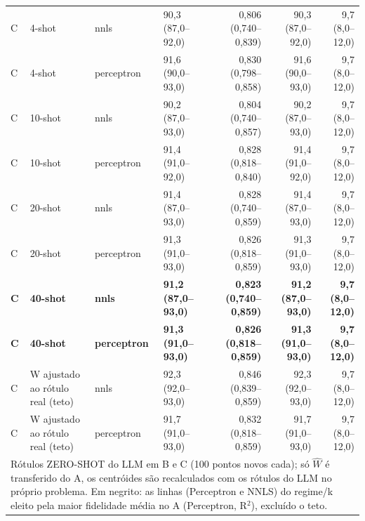 \begin{table}[htbp]
\begin{tabular}{llllrrr}
C & 4-shot & nnls & 90,3 (87,0–92,0) & 0,806 (0,740–0,839) & 90,3 (87,0–92,0) & 9,7 (8,0–12,0) \\
C & 4-shot & perceptron & 91,6 (90,0–93,0) & 0,830 (0,798–0,858) & 91,6 (90,0–93,0) & 9,7 (8,0–12,0) \\
C & 10-shot & nnls & 90,2 (87,0–93,0) & 0,804 (0,740–0,857) & 90,2 (87,0–93,0) & 9,7 (8,0–12,0) \\
C & 10-shot & perceptron & 91,4 (91,0–92,0) & 0,828 (0,818–0,840) & 91,4 (91,0–92,0) & 9,7 (8,0–12,0) \\
C & 20-shot & nnls & 91,4 (87,0–93,0) & 0,828 (0,740–0,859) & 91,4 (87,0–93,0) & 9,7 (8,0–12,0) \\
C & 20-shot & perceptron & 91,3 (91,0–93,0) & 0,826 (0,818–0,859) & 91,3 (91,0–93,0) & 9,7 (8,0–12,0) \\
\textbf{C} & \textbf{40-shot} & \textbf{nnls} & \textbf{91,2 (87,0–93,0)} & \textbf{0,823 (0,740–0,859)} & \textbf{91,2 (87,0–93,0)} & \textbf{9,7 (8,0–12,0)} \\
\textbf{C} & \textbf{40-shot} & \textbf{perceptron} & \textbf{91,3 (91,0–93,0)} & \textbf{0,826 (0,818–0,859)} & \textbf{91,3 (91,0–93,0)} & \textbf{9,7 (8,0–12,0)} \\
C & W ajustado ao rótulo real (teto) & nnls & 92,3 (92,0–93,0) & 0,846 (0,839–0,859) & 92,3 (92,0–93,0) & 9,7 (8,0–12,0) \\
C & W ajustado ao rótulo real (teto) & perceptron & 91,7 (91,0–93,0) & 0,832 (0,818–0,859) & 91,7 (91,0–93,0) & 9,7 (8,0–12,0) \\
\bottomrule
\multicolumn{7}{p{0.95\linewidth}}{\footnotesize Rótulos ZERO-SHOT do LLM em B e C (100 pontos novos cada); só $\hat{W}$ é transferido do A, os centróides são recalculados com os rótulos do LLM no próprio problema. Em negrito: as linhas (Perceptron e NNLS) do regime/k eleito pela maior fidelidade média no A (Perceptron, R$^2$), excluído o teto.} \\
\end{tabular}
\end{table}
